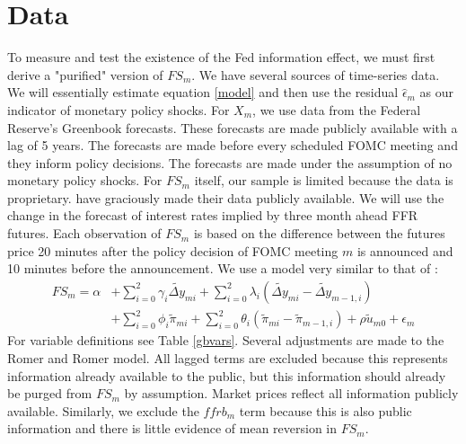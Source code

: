 \documentclass[a4paper,man,floatsintext,natbib]{apa6}
\begin{document}
	\section{Data}
	To measure and test the existence of the Fed information effect, we must first derive a "purified" version of \(FS_m\). We have several sources of time-series data. We will essentially estimate equation \ref{model} and then use the residual \(\hat{\epsilon}_m\) as our indicator of monetary policy shocks. For \(X_m\), we use data from the Federal Reserve's Greenbook forecasts. These forecasts are made publicly available with a lag of 5 years. The forecasts are made before every scheduled FOMC meeting and they inform policy decisions. The forecasts are made under the assumption of no monetary policy shocks. For \(FS_m\) itself, our sample is limited because the data is proprietary. \cite{Nakamura2018} have graciously made their data publicly available. We will use the change in the forecast of interest rates implied by three month ahead FFR futures. Each observation of \(FS_m\) is based on the difference between the futures price 20 minutes after the policy decision of FOMC meeting \(m\) is announced and 10 minutes before the announcement. We use a model very similar to that of \cite{Romer2004}:
	\begin{align*}
		FS_m =  \alpha &+ \sum_{i=0}^{2} \gamma_i \widetilde{\Delta y}_{mi} + \sum^2_{i=0} \lambda_i \left(\widetilde{\Delta y}_{mi}-\widetilde{\Delta y}_{m-1,i}\right) \tag{5} \label{ep_hat_model} \\
		&+\sum^{2}_{i=0} \phi_i \tilde{\pi}_{mi} + \sum^2_{i=0} \theta_i \left(\tilde{ \pi}_{mi}-\tilde{ \pi}_{m-1,i}\right) + \rho \tilde{u}_{m0} + \epsilon_m
	\end{align*}
	For variable definitions see Table \ref{gbvars}. Several adjustments are made to the Romer and Romer model. All lagged terms are excluded because this represents information already available to the public, but this information should already be purged from \(FS_m\) by assumption. Market prices reflect all information publicly available. Similarly, we exclude the \(ffrb_m\) term because this is also public information and there is little evidence of mean reversion in \(FS_m\). 
\end{document}

